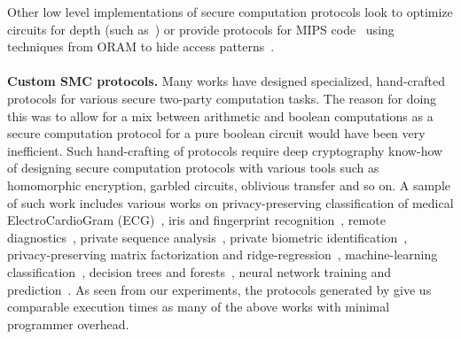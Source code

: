 Other low level implementations of secure computation protocols look to optimize circuits for depth (such as~\cite{ddkssz15}) or provide protocols for MIPS code~\cite{mips} using techniques from ORAM to hide access patterns~\cite{oram1,oram2}.
\\\\
\noindent\textbf{Custom SMC protocols.} Many works have designed specialized, hand-crafted protocols for various secure two-party computation tasks. The reason for doing this was to allow for a mix between arithmetic and boolean computations as a secure computation protocol for a pure boolean circuit would have been very inefficient. Such hand-crafting of protocols require deep cryptography know-how of designing secure computation protocols with various tools such as homomorphic encryption, garbled circuits, oblivious transfer and so on. A sample of such work includes various works on privacy-preserving classification of medical ElectroCardioGram (ECG)~\cite{ecgclassifier}, iris and fingerprint recognition~\cite{irisfingerprint}, remote diagnostics~\cite{remotediagnostics}, private sequence analysis~\cite{sequenceanalysis}, private biometric identification~\cite{biometricidentification}, privacy-preserving matrix factorization and ridge-regression~\cite{matrixfactorization, ridgeregression}, machine-learning classification~\cite{shafindss}, decision trees and forests~\cite{wu}, neural network training and prediction~\cite{secureml,minionn}. As seen from our experiments, the protocols generated by \tool give us comparable execution times as many of the above works with minimal programmer overhead. 